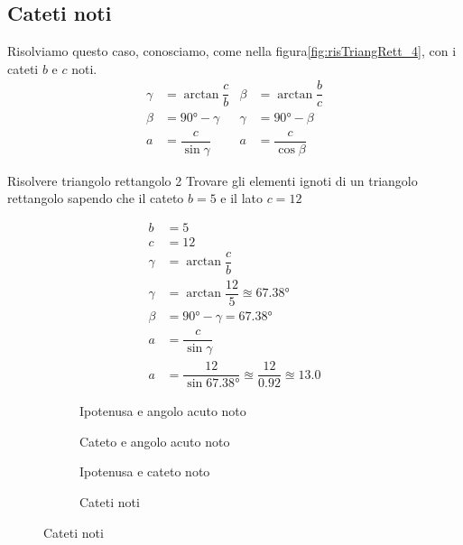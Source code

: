 \subsection{Cateti noti}
Risolviamo questo caso, conosciamo, come nella figura\nobs\vref{fig:risTriangRett_4}, con i cateti $b$ e $c$ noti.
\begin{align*}
\gamma&=\arctan\dfrac{c}{b}&\beta&=\arctan\dfrac{b}{c}\\
\beta&=\ang{90}-\gamma&\gamma&=\ang{90}-\beta\\
a&=\dfrac{c}{\sin\gamma}&a&=\dfrac{c}{\cos\beta}
\end{align*}
\begin{esempiot}{Risolvere triangolo rettangolo 2}{}
Trovare gli elementi ignoti di un triangolo rettangolo sapendo che  il cateto $b=5$ e il lato $c=12$
\end{esempiot}
\begin{align*}
b&=5\\
c&=12\\
\gamma&=\arctan\dfrac{c}{b}\\
\gamma&=\arctan\dfrac{12}{5}\approxeq\ang{67.38}\\
\beta&=\ang{90}-\gamma=\ang{67.38}\\
a&=\dfrac{c}{\sin\gamma}\\
a&=\dfrac{12}{\sin\ang{67.38}}\approxeq\dfrac{12}{\num{0.92}}\approxeq\num{13.0}
\end{align*}
\begin{figure}
	\begin{subfigure}[b]{.5\linewidth}
		\centering

	\caption{Ipotenusa e angolo acuto noto}
	\label{fig:risTriangRett_1}
	\end{subfigure}%
	\begin{subfigure}[b]{.5\linewidth}
		\centering
		
		\caption{Cateto e angolo acuto noto}
		\label{fig:risTriangRett_2}
	\end{subfigure}
	\begin{subfigure}[b]{.5\linewidth}
		\centering
	
	\caption{Ipotenusa e cateto noto}
	\label{fig:risTriangRett_3}
	\end{subfigure}%
	\begin{subfigure}[b]{.5\linewidth}
		\centering
		
		\caption{Cateti noti}
		\label{fig:risTriangRett_4}
	\end{subfigure}
	\label{fig:RisoluzioneTriangoliRettangoli}
\end{figure}
